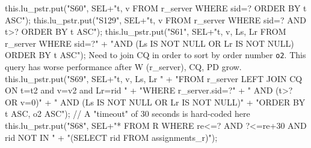 this.lu_pstr.put("S60", SEL+"t, v FROM r_server WHERE sid=? ORDER BY t ASC");
\eatline
{}\nwendcode{}\endmoddef{}
this.lu_pstr.put("S129", SEL+"t, v FROM r_server WHERE sid=? AND t>? ORDER BY t ASC");
\eatline
{}\nwendcode{}\endmoddef{}
this.lu_pstr.put("S61", SEL+"t, v, Ls, Lr FROM r_server WHERE sid=?"
      + "AND (Ls IS NOT NULL OR Lr IS NOT NULL) ORDER BY t ASC");
\eatline
{}\nwendcode{}Need to join CQ in order to sort by order number {\tt{}o2}. This query has
worse performance after W (r\_server), CQ, PD grow.
\nwenddocs{}\endmoddef{}
this.lu_pstr.put("S69", SEL+"t, v, Ls, Lr "
      + "FROM r_server LEFT JOIN CQ ON t=t2 and v=v2 and Lr=rid "
      + "WHERE r_server.sid=?"
      + "   AND (t>? OR v=0)"
      + "   AND (Ls IS NOT NULL OR Lr IS NOT NULL)"
      + "ORDER BY t ASC, o2 ASC");
\eatline
{}\nwendcode{}\endmoddef{}
// A "timeout" of 30 seconds is hard-coded here
this.lu_pstr.put("S68", SEL+"* FROM R WHERE re<=? AND ?<=re+30 AND rid NOT IN  "
      + "(SELECT rid FROM assignments_r)");
\eatline
{}\nwendcode{}\endmoddef{}
